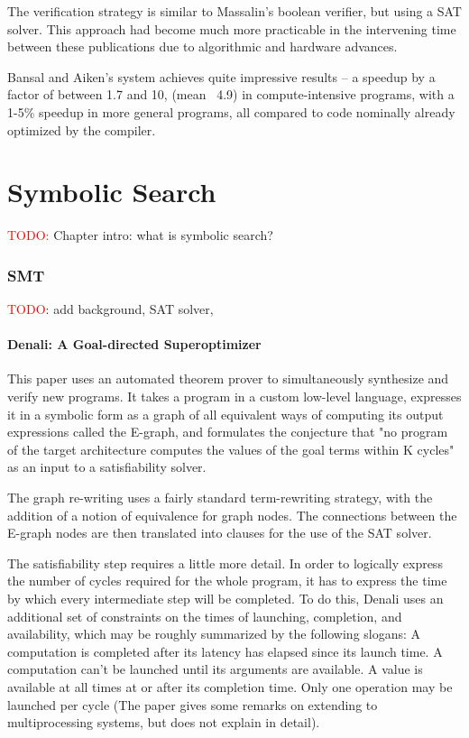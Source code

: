 \documentclass[12pt,twoside]{reedthesis}
\newcommand{\red}[1]{\textcolor{red}{#1}}
\begin{document}
The verification strategy is similar to Massalin's boolean verifier, but using a SAT solver.
This approach had become much more practicable in the intervening time between these publications due to algorithmic and hardware advances.

Bansal and Aiken's system achieves quite impressive results 
    -- a speedup by a factor of between 1.7 and 10, (mean ~4.9) in compute-intensive programs, with a 1-5\% speedup in more general programs, all compared to code nominally already optimized by the compiler.

\chapter{Symbolic Search}

\red{TODO:} Chapter intro: what is symbolic search?

\subsection{SMT}

\red{TODO}: add background, SAT solver, 

\subsubsection{Denali: A Goal-directed Superoptimizer}
This paper \cite{joshi2002denali} uses an automated theorem prover to simultaneously synthesize and verify new programs.
It takes a program in a custom low-level language, expresses it in a symbolic form as a graph of all equivalent ways of computing its output expressions called the E-graph, and formulates the conjecture that "no program of the target architecture computes the values of the goal terms within K cycles" as an input to a satisfiability solver. 

The graph re-writing uses a fairly standard term-rewriting strategy, with the addition of a notion of equivalence for graph nodes.
The connections between the E-graph nodes are then translated into clauses for the use of the SAT solver.

The satisfiability step requires a little more detail.
In order to logically express the number of cycles required for the whole program, it has to express the time by which every intermediate step will be completed.
To do this, Denali uses an additional set of constraints on the times of launching, completion, and availability, which may be roughly summarized by the following slogans:
    A computation is completed after its latency has elapsed since its launch time.
    A computation can't be launched until its arguments are available.
    A value is available at all times at or after its completion time.
    Only one operation may be launched per cycle (The paper gives some remarks on extending to multiprocessing systems, but does not explain in detail).
\end{document}
